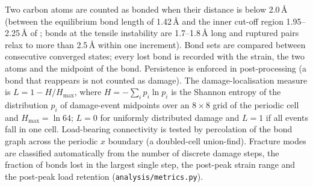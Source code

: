 Two carbon atoms are counted as bonded when their distance is below 2.0\,\AA{} (between the equilibrium bond length of 1.42\,\AA{} and the inner cut-off region 1.95--2.25\,\AA{} of \rebo{}; bonds at the tensile instability are 1.7--1.8\,\AA{} long and ruptured pairs relax to more than 2.5\,\AA{} within one increment). Bond sets are compared between consecutive converged states; every lost bond is recorded with the strain, the two atoms and the midpoint of the bond. Persistence is enforced in post-processing (a bond that reappears is not counted as damage). The damage-localisation measure is $L=1-H/H_\mathrm{max}$, where $H=-\sum_i p_i\ln p_i$ is the Shannon entropy of the distribution $p_i$ of damage-event midpoints over an $8\times8$ grid of the periodic cell and $H_\mathrm{max}=\ln 64$; $L=0$ for uniformly distributed damage and $L=1$ if all events fall in one cell. Load-bearing connectivity is tested by percolation of the bond graph across the periodic $x$ boundary (a doubled-cell union-find). Fracture modes are classified automatically from the number of discrete damage steps, the fraction of bonds lost in the largest single step, the post-peak strain range and the post-peak load retention (\texttt{analysis/metrics.py}).
